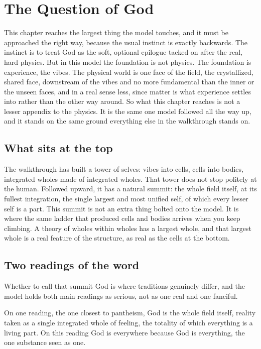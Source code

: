 \section{The Question of God}

This chapter reaches the largest thing the model touches, and it must be approached the right way, because the usual instinct is exactly backwards. The instinct is to treat God as the soft, optional epilogue tacked on after the real, hard physics. But in this model the foundation is not physics. The foundation is experience, the vibes. The physical world is one face of the field, the crystallized, shared face, downstream of the vibes and no more fundamental than the inner or the unseen faces, and in a real sense less, since matter is what experience settles into rather than the other way around. So what this chapter reaches is not a lesser appendix to the physics. It is the same one model followed all the way up, and it stands on the same ground everything else in the walkthrough stands on.

\subsection{What sits at the top}

The walkthrough has built a tower of selves: vibes into cells, cells into bodies, integrated wholes made of integrated wholes. That tower does not stop politely at the human. Followed upward, it has a natural summit: the whole field itself, at its fullest integration, the single largest and most unified self, of which every lesser self is a part. This summit is not an extra thing bolted onto the model. It is where the same ladder that produced cells and bodies arrives when you keep climbing. A theory of wholes within wholes has a largest whole, and that largest whole is a real feature of the structure, as real as the cells at the bottom.

\subsection{Two readings of the word}

Whether to call that summit God is where traditions genuinely differ, and the model holds both main readings as serious, not as one real and one fanciful.

On one reading, the one closest to pantheism, God is the whole field itself, reality taken as a single integrated whole of feeling, the totality of which everything is a living part. On this reading God is everywhere because God is everything, the one substance seen as one.

